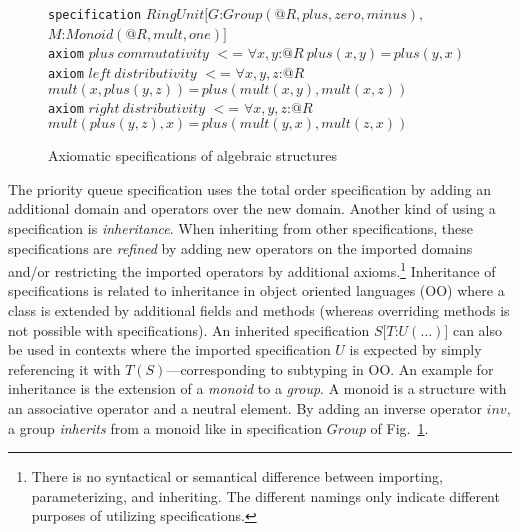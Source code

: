 \documentclass{article}
\theoremstyle{remark}
\theoremstyle{definition}
\newcommand{\ieq}{\,\texttt{=}\,}
\newcommand{\name}[1]{\mathit{#1}}
\begin{document}
\begin{figure}[t]
\begin{tabbing}
\texttt{specification} $\name{RingUnit}[G$:$\name{Group}(@R,\name{plus},\name{zero},\name{minus}),$ \\
\> \> \>  $M$:$\name{Monoid}(@R,\name{mult},\name{one})]$ \\
\> \texttt{axiom} $\name{plus}\ \name{commutativity}$ $<$= $\forall x,y$:$@R\ \name{plus}(x,y)\ieq \name{plus}(y,x)$ \\
\> \texttt{axiom} $\name{left}\ \name{distributivity}$ $<$= $\forall x,y,z$:$@R$\\
\> \> $\name{mult}(x,\name{plus}(y,z))\ieq \name{plus}(\name{mult}(x,y),\name{mult}(x,z))$ \\
\> \texttt{axiom} $\name{right}\ \name{distributivity}$ $<$= $\forall x,y,z$:$@R$ \\
\> \> $\name{mult}(\name{plus}(y,z),x)\ieq \name{plus}(\name{mult}(y,x),\name{mult}(z,x))$
\end{tabbing}

\caption{Axiomatic specifications of algebraic structures} \label{fig:algstruct}
\end{figure}

The priority queue specification uses the total order specification by adding an additional domain and operators over
the new domain. Another kind of using a specification is \emph{inheritance}. When inheriting from other specifications,
these specifications are \emph{refined} by adding new operators on the imported domains and/or restricting the imported
operators by additional axioms.\footnote{There is no syntactical or semantical difference between importing,
parameterizing, and inheriting. The different namings only indicate different purposes of utilizing specifications.}
Inheritance of specifications is related to inheritance in object oriented languages (OO) where a class is extended by
additional fields and methods (whereas overriding methods is not possible with specifications). An inherited
specification $S[T$:$U(\ldots)]$ can also be used in contexts where the imported specification $U$ is expected by
simply referencing it with $T(S)$---corresponding to subtyping in OO. An example for inheritance is the extension of a
\emph{monoid} to a \emph{group}. A monoid is a structure with an associative operator and a neutral element. By adding
an inverse operator $\name{inv}$, a group \emph{inherits} from a monoid like in specification $\name{Group}$ of
Fig.~\ref{fig:algstruct}.
\end{document}
